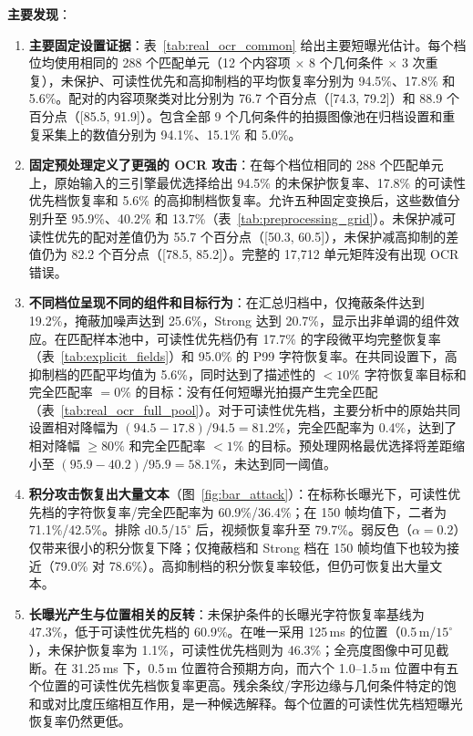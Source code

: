 \documentclass{ieeeaccess}
\begin{document}
\textbf{主要发现}：

\begin{enumerate}
\item \textbf{主要固定设置证据}：表~\ref{tab:real_ocr_common} 给出主要短曝光估计。每个档位均使用相同的 288 个匹配单元（12 个内容项 $\times$ 8 个几何条件 $\times$ 3 次重复），未保护、可读性优先和高抑制档的平均恢复率分别为 94.5\%、17.8\% 和 5.6\%。配对的内容项聚类对比分别为 76.7 个百分点（[74.3, 79.2]）和 88.9 个百分点（[85.5, 91.9]）。包含全部 9 个几何条件的拍摄图像池在归档设置和重复采集上的数值分别为 94.1\%、15.1\% 和 5.0\%。

\item \textbf{固定预处理定义了更强的 OCR 攻击}：在每个档位相同的 288 个匹配单元上，原始输入的三引擎最优选择给出 94.5\% 的未保护恢复率、17.8\% 的可读性优先档恢复率和 5.6\% 的高抑制档恢复率。允许五种固定变换后，这些数值分别升至 95.9\%、40.2\% 和 13.7\%（表~\ref{tab:preprocessing_grid}）。未保护减可读性优先的配对差值仍为 55.7 个百分点（[50.3, 60.5]），未保护减高抑制的差值仍为 82.2 个百分点（[78.5, 85.2]）。完整的 17,712 单元矩阵没有出现 OCR 错误。

\item \textbf{不同档位呈现不同的组件和目标行为}：在汇总归档中，仅掩蔽条件达到 19.2\%，掩蔽加噪声达到 25.6\%，Strong 达到 20.7\%，显示出非单调的组件效应。在匹配样本池中，可读性优先档仍有 17.7\% 的字段微平均完整恢复率（表~\ref{tab:explicit_fields}）和 95.0\% 的 P99 字符恢复率。在共同设置下，高抑制档的匹配平均值为 5.6\%，同时达到了描述性的 $<10\%$ 字符恢复率目标和完全匹配率 $=0\%$ 的目标：没有任何短曝光拍摄产生完全匹配（表~\ref{tab:real_ocr_full_pool}）。对于可读性优先档，主要分析中的原始共同设置相对降幅为 $(94.5-17.8)/94.5=81.2\%$，完全匹配率为 0.4\%，达到了相对降幅 $\geq80\%$ 和完全匹配率 $<1\%$ 的目标。预处理网格最优选择将差距缩小至 $(95.9-40.2)/95.9=58.1\%$，未达到同一阈值。

\item \textbf{积分攻击恢复出大量文本}（图~\ref{fig:bar_attack}）：在标称长曝光下，可读性优先档的字符恢复率/完全匹配率为 60.9\%/36.4\%；在 150 帧均值下，二者为 71.1\%/42.5\%。排除 d0.5/$15^{\circ}$ 后，视频恢复率升至 79.7\%。弱反色（$\alpha=0.2$）仅带来很小的积分恢复下降；仅掩蔽档和 Strong 档在 150 帧均值下也较为接近（79.0\% 对 78.6\%）。高抑制档的积分恢复率较低，但仍可恢复出大量文本。

\item \textbf{长曝光产生与位置相关的反转}：未保护条件的长曝光字符恢复率基线为 47.3\%，低于可读性优先档的 60.9\%。在唯一采用 125\,ms 的位置（0.5\,m/$15^{\circ}$），未保护恢复率为 1.1\%，可读性优先档则为 46.3\%；全亮度图像中可见截断。在 31.25\,ms 下，0.5\,m 位置符合预期方向，而六个 1.0--1.5\,m 位置中有五个位置的可读性优先档恢复率更高。残余条纹/字形边缘与几何条件特定的饱和或对比度压缩相互作用，是一种候选解释。每个位置的可读性优先档短曝光恢复率仍然更低。


\end{enumerate}
\end{document}
